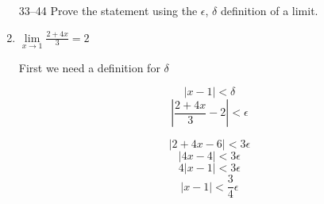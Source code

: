\documentclass{article}
\begin{document}
\begin{enumerate}
		\item[33--44] Prove the statement using the $\epsilon$, $\delta$ definition of a limit.
		
		\item $\lim \limits _{x \to 1} \frac{2 + 4x}{3} = 2$
		
			First we need a definition for $\delta$
			
			$$|x - 1| < \delta$$
			$$|\frac{2 + 4x}{3} -2| < \epsilon$$
			
			$$|2 + 4x - 6| < 3\epsilon$$
			$$|4x - 4| < 3\epsilon$$
			$$4|x - 1| < 3\epsilon$$
			$$|x - 1| < \frac{3}{4}\epsilon$$
				

	\end{enumerate}
\end{document}
